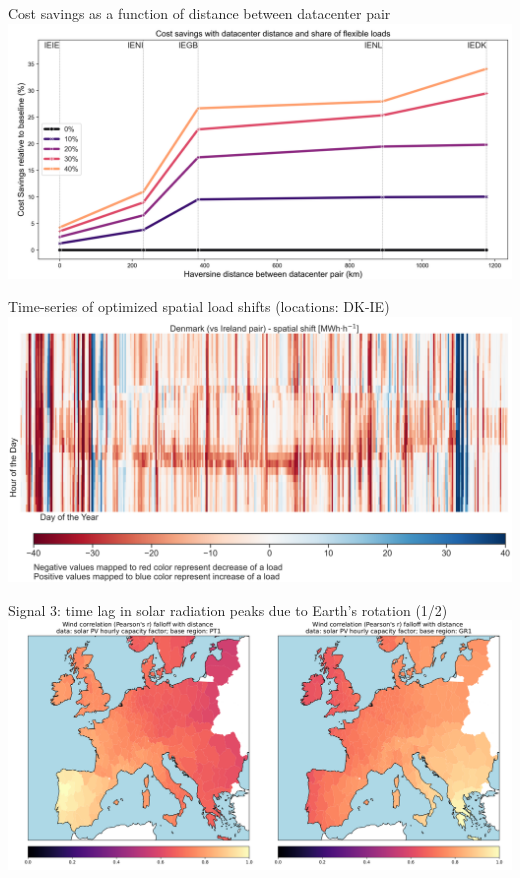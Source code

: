\begin{frame}{Cost savings as a function of distance between datacenter pair}
  \centering
  \vspace{0.3cm}
  \includegraphics[width=14cm]{images/results-5.png}
\end{frame}


\begin{frame}{Time-series of optimized spatial load shifts (locations: DK-IE)}
  \centering
  \vspace{0.3cm}
  \includegraphics[width=14cm]{images/results-6.png}
\end{frame}


\begin{frame}{Signal 3: time lag in solar radiation peaks due to Earth's rotation (1/2)}
  \centering
  \vspace{0.3cm}
  \includegraphics[width=14cm]{images/results-7.png}
\end{frame}


